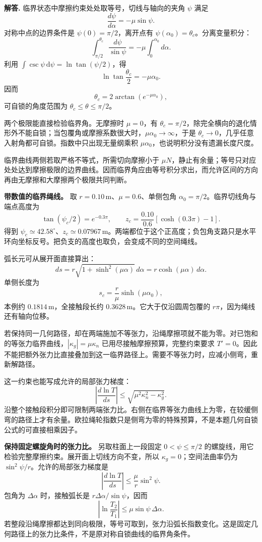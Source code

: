 \documentclass[12pt,a4paper,UTF8]{ctexart}
\begin{document}
\textbf{解答.} 临界状态中摩擦约束处处取等号，切线与轴向的夹角 \(\psi\)
满足 \[
\frac{d\psi}{d\alpha}=-\mu\sin\psi.
\] 对称中点的边界条件是 \(\psi(0)=\pi/2\)，离开点有
\(\psi(\alpha_0)=\theta_c\)。分离变量积分： \[
\int_{\pi/2}^{\theta_c}\frac{d\psi}{\sin\psi}
=-\mu\int_0^{\alpha_0}d\alpha.
\] 利用 \(\int\csc\psi\,\mathrm d\psi=\ln\tan(\psi/2)\)，得 \[
\ln\tan\frac{\theta_c}{2}=-\mu\alpha_0.
\] 因而 \[
\boxed{\theta_c=2\arctan(e^{-\mu\alpha_0})},
\] 可自锁的角度范围为 \(\theta_c\le\theta\le\pi/2\)。

两个极限能直接检验临界角。无摩擦时 \(\mu=0\)，有
\(\theta_c=\pi/2\)，除完全横向的退化情形外不能自锁；当包覆角或摩擦系数很大时，\(\mu\alpha_0\to\infty\)，于是
\(\theta_c\to0\)，几乎任意入射角都可自锁。指数中只出现无量纲乘积
\(\mu\alpha_0\)，也说明积分没有遗漏长度尺度。

临界曲线两侧若取严格不等式，所需切向摩擦小于
\(\mu N\)，静止有余量；等号只对应处处达到摩擦极限的边界曲线。因而临界角应由等号积分求出，而允许区间的方向再由无摩擦和大摩擦两个极限共同判断。

\textbf{带数值的临界绳线。} 取
\(r=0.10\,\mathrm m\)、\(\mu=0.6\)、单侧包角
\(\alpha_0=\pi/2\)。临界切线角与端点高度为 \[
\tan(\psi_c/2)=e^{-0.3\pi},\qquad
z_c=\frac{0.10}{0.6}[\cosh(0.3\pi)-1].
\] 得到
\(\psi_c\simeq42.58^\circ\)、\(z_c\simeq0.07967\,\mathrm m\)。两端都位于这个正高度；负包角支路只是水平环向坐标反号。把负支的高度也取负，会变成不同的空间绳线。

弧长元可从展开面直接算出： \[
ds=r\sqrt{1+\sinh^2(\mu\alpha)}\,d\alpha
=r\cosh(\mu\alpha)\,d\alpha.
\] 单侧长度为 \[
s_c=\frac r\mu\sinh(\mu\alpha_0),
\] 本例约 \(0.1814\,\mathrm m\)，全接触段长约
\(0.3628\,\mathrm m\)。它大于仅沿圆周包覆的
\(r\pi\)，因为绳线还有轴向位移。

若保持同一几何路径，却在两端施加不等张力，沿绳摩擦项就不能为零。对已饱和的等张力临界曲线，\(|\kappa_g|=\mu\kappa_n\)
已用尽接触摩擦预算，完整约束要求
\(T'=0\)。因此不能把额外张力比直接叠加到这一临界路径上。需要不等张力时，应减小侧弯，重新解路径。

这一约束也能写成允许的局部张力梯度： \[
\left|\frac{d\ln T}{ds}\right|\le
\sqrt{\mu^2\kappa_n^2-\kappa_g^2}.
\]
沿整个接触段积分即可限制两端张力比。右侧在临界等张力曲线上为零，在较缓侧弯的路径上才有余量。欧拉绳轮指数只是侧弯为零的特殊预算，不是本题几何自锁公式的可直接相乘因子。

\textbf{保持固定螺旋角时的张力比。} 另取柱面上一段固定
\(0<\psi\le\pi/2\)
的螺旋线，用它检验完整摩擦约束。展开面上切线方向不变，所以
\(\kappa_g=0\)；空间法曲率仍为 \(\sin^2\psi/r\)。允许的局部张力梯度是 \[
\left|\frac{d\ln T}{ds}\right|\le\frac\mu r\sin^2\psi.
\] 包角为 \(\Delta\alpha\) 时，接触弧长是
\(r\Delta\alpha/\sin\psi\)，因而 \[
\left|\ln\frac{T_2}{T_1}\right|
\le\mu\sin\psi\,\Delta\alpha.
\]
若整段沿绳摩擦都达到同向极限，等号可取到，张力沿弧长指数变化。这是固定几何路径上的张力比条件，不是原对称自锁曲线的临界角条件。
\end{document}
